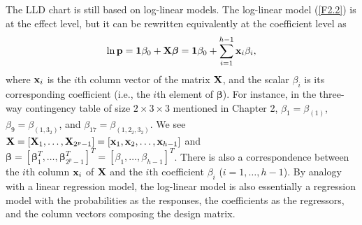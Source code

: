 The LLD chart is still based on log-linear models. The log-linear model (\ref{F2.2})
is at the effect level, but it can be rewritten equivalently at the coefficient
level as
\begin{equation}
\ln {\bf p}=\bm{1}\beta_0+{\bf X}\bm\beta=\bm{1}\beta_0+\sum_{i=1}^{h-1}{\bf
x}_i\beta_i,\label{F3.1}
\end{equation}
where ${\bf x}_i$ is the $i$th column vector of the matrix ${\bf X}$, and the scalar
$\beta_i$ is its corresponding coefficient (i.e., the $i$th element of $\bm\beta$).
For instance, in the three-way contingency table of size $2\times 3\times 3$
mentioned in Chapter 2, $\beta_1=\beta_{(1)}$, $\beta_{9}=\beta_{(1,3_2)}$, and
$\beta_{17}=\beta_{(1,2_2,3_2)}$. We see ${\bf X}=[{\bf X}_1,\ldots,{\bf
X}_{2^p-1}]=[{\bf x}_1,{\bf x}_2,\ldots,{\bf x}_{h-1}]$ and
$\bm\beta=[\bm{\beta}_1^T,\ldots,\bm{\beta}_{2^p-1}^T]^T=
[\beta_1,\ldots,\beta_{h-1}]^T$. There is also a correspondence between the $i$th
column ${\bf x}_i$ of ${\bf X}$ and the $i$th coefficient $\beta_i$
($i=1,\ldots,h-1$). By analogy with a linear regression model, the log-linear model
is also essentially a regression model with the probabilities as the responses, the
coefficients as the regressors, and the column vectors composing the design matrix.

